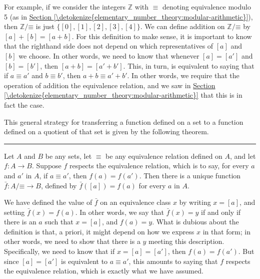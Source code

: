 \documentclass[letterpaper,10pt,english]{sphinxmanual}
\begin{document}
\sphinxAtStartPar
For example, if we consider the integers \(\mathbb{Z}\) with \(\equiv\) denoting equivalence modulo 5 (as in \hyperref[\detokenize{elementary_number_theory:modular-arithmetic}]{Section \ref{\detokenize{elementary_number_theory:modular-arithmetic}}}), then \(\mathbb{Z} / \mathord{\equiv}\) is just \(\{ [0], [1], [2], [3], [4] \}\). We can define addition on \(\mathbb{Z} / \mathord{\equiv}\) by \([a] + [b] = [a + b]\). For this definition to make sense, it is important to know that the right\sphinxhyphen{}hand side does not depend on which representatives of \([a]\) and \([b]\) we choose. In other words, we need to know that whenever \([a] = [a']\) and \([b] = [b']\), then \([a + b] = [a' + b']\). This, in turn, is equivalent to saying that if \(a \equiv a'\) and \(b \equiv b'\), then \(a + b \equiv a' + b'\). In other words, we require that the operation of addition  the equivalence relation, and we saw in \hyperref[\detokenize{elementary_number_theory:modular-arithmetic}]{Section \ref{\detokenize{elementary_number_theory:modular-arithmetic}}} that this is in fact the case.

\sphinxAtStartPar
This general strategy for transferring a function defined on a set to a function defined on a quotient of that set is given by the following theorem.


\bigskip\hrule\bigskip


\sphinxAtStartPar
{} Let \(A\) and \(B\) be any sets, let \(\equiv\) be any equivalence relation defined on \(A\), and let \(f : A \to B\). Suppose \(f\) respects the equivalence relation, which is to say, for every \(a\) and \(a'\) in \(A\), if \(a \equiv a'\), then \(f(a) = f(a')\). Then there is a unique function \(\bar f : A / \mathord{\equiv} \to B\), defined by \(\bar f ([a]) = f(a)\) for every \(a\) in \(A\).

\sphinxAtStartPar
{} We have defined the value of \(\bar f\) on an equivalence class \(x\) by writing \(x = [a]\), and setting \(\bar f(x) = f(a)\). In other words, we say that \(\bar f(x) = y\) if and only if there is an \(a\) such that \(x = [a]\), and \(f(a) = y\). What is dubious about the definition is that, a priori, it might depend on how we express \(x\) in that form; in other words, we need to show that there is a  \(y\) meeting this description. Specifically, we need to know that if \(x = [a] = [a']\), then \(f(a) = f(a')\). But since \([a] = [a']\) is equivalent to \(a \equiv a'\), this amounts to saying that \(f\) respects the equivalence relation, which is exactly what we have assumed.
\end{document}
